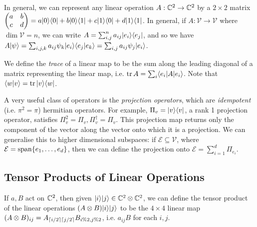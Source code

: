 \documentclass[10pt,a4paper]{article}
\begin{document}
In general, we can represent any linear operation $A:\mathbb{C}^2 \to \mathbb{C}^2$ by a $2\times 2$ matrix $\begin{pmatrix} a & b \\ c& d\end{pmatrix} = a |0\rangle\langle 0| + b|0\rangle\langle 1| + c |1\rangle\langle 0| + d |1\rangle\langle 1|$. In general, if $A : \mathcal{V} \to \mathcal{V}$ where $\dim \mathcal{V} = n$, we can write $A = \sum_{i,j}^n a_{ij}|e_i\rangle\langle e_j|$, and so we have $A|\psi\rangle = \sum_{i,j,k} a_{ij}\psi_k |e_i\rangle\langle e_j | e_k \rangle = \sum_{i,j} a_{ij}\psi_j|e_i\rangle$.

We define the \emph{trace} of a linear map to be the sum along the leading diagonal of a matrix representing the linear map, i.e. $\operatorname{tr} A = \sum_{i} \langle e_i|A|e_i\rangle$. Note that $\langle w | v \rangle = \operatorname{tr} |v\rangle\langle w|$.

A very useful class of operators is the \emph{projection operators}, which are \emph{idempotent} (i.e. $\pi^2 = \pi$) hermitian operators. For example, $\Pi_v = |v\rangle\langle v|$, a rank 1 projection operator, satisfies $\Pi_v^2 = \Pi_v, \Pi_v^{\dag} = \Pi_v$. This projection map returns only the component of the vector along the vector onto which it is a projection. We can generalise this to higher dimensional subspaces: if $\mathcal{E} \subseteq \mathcal{V}$, where $\mathcal{E} = \operatorname{span} \{e_1, \ldots, e_d\}$, then we can define the projection onto $\mathcal{E} = \sum_{i=1}^d \Pi_{e_i}$.

\subsection{Tensor Products of Linear Operations}
If $a,B$ act on $\mathbb{C}^2$, then given $|i\rangle|j\rangle \in \mathbb{C}^2 \otimes \mathbb{C}^2$, we can define the tensor product of the linear operations $(A \otimes B)|i\rangle|j\rangle$ to be the $4 \times 4$ linear map $(A\otimes B)_{ij} = A_{\lceil i/2 \rceil\lceil j/2 \rceil}B_{i\%2, j\%2}$, i.e. $a_{ij}B$ for each $i,j$.
\end{document}
